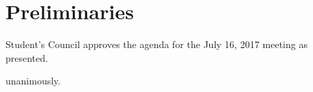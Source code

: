 \section*{Preliminaries}

\begin{information}
\end{information}

\begin{motion}
    \birt Student's Council approves the agenda for the 
    July 16, 2017 meeting as presented. 
    \movers{\brian}{\rebecca}

    \carries unanimously.
\end{motion}



